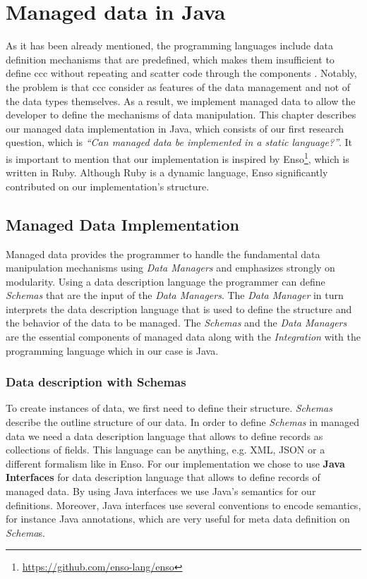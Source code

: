 
\chapter{Managed data in Java}\label{Implementation}

As it has been already mentioned, the programming languages include data definition mechanisms that are predefined, which makes them insufficient to define \ac{ccc} without repeating and scatter code through the components \cite{loh2012managed}.
Notably, the problem is that \ac{ccc} consider as features of the data management and not of the data types themselves.
As a result, we implement managed data to allow the developer to define the mechanisms of data manipulation.
This chapter describes our managed data implementation in Java, which consists of our first research question, which is \textit{``Can managed data be implemented in a static language?''}.
It is important to mention that our implementation is inspired by Enso\footnote{\url{https://github.com/enso-lang/enso}}, which is written in Ruby. 
Although Ruby is a dynamic language, Enso significantly contributed on our implementation's structure.

\section{Managed Data Implementation}\label{sec:Managed Data Implementation}
Managed data provides the programmer to handle the fundamental data manipulation mechanisms using \textit{Data Managers} and emphasizes strongly on modularity.
Using a data description language the programmer can define \textit{Schemas} that are the input of the \textit{Data Managers}. The \textit{Data Manager} in turn interprets the data description language that is used to define the structure and the behavior of the data to be managed.
The \textit{Schemas} and the \textit{Data Managers} are the essential components of managed data along with the \textit{Integration} with the programming language which in our case is Java.

\subsection{Data description with Schemas}\label{Schema Definition}
To create instances of data, we first need to define their structure.
\textit{Schemas} describe the outline structure of our data.
In order to define \textit{Schemas} in managed data we need a data description language that allows to define records as collections of fields. 
This language can be anything, e.g. XML, JSON or a different formalism like in Enso.
For our implementation we chose to use \textbf{Java Interfaces} for data description language that allows to define records of managed data.
By using Java interfaces we use Java's semantics for our definitions.
Moreover, Java interfaces use several conventions to encode semantics, for instance Java annotations, which are very useful for meta data definition on \textit{Schema}s.

